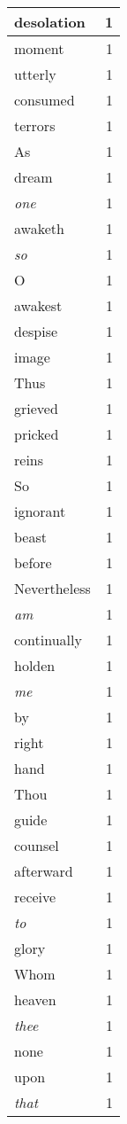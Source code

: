 \begin{center}
\begin{longtable}{l|r}
desolation & 1 \\ \hline
moment & 1 \\ \hline
utterly & 1 \\ \hline
consumed & 1 \\ \hline
terrors & 1 \\ \hline
As & 1 \\ \hline
dream & 1 \\ \hline
\emph{one} & 1 \\ \hline
awaketh & 1 \\ \hline
\emph{so} & 1 \\ \hline
O & 1 \\ \hline
awakest & 1 \\ \hline
despise & 1 \\ \hline
image & 1 \\ \hline
Thus & 1 \\ \hline
grieved & 1 \\ \hline
pricked & 1 \\ \hline
reins & 1 \\ \hline
So & 1 \\ \hline
ignorant & 1 \\ \hline
beast & 1 \\ \hline
before & 1 \\ \hline
Nevertheless & 1 \\ \hline
\emph{am} & 1 \\ \hline
continually & 1 \\ \hline
holden & 1 \\ \hline
\emph{me} & 1 \\ \hline
by & 1 \\ \hline
right & 1 \\ \hline
hand & 1 \\ \hline
Thou & 1 \\ \hline
guide & 1 \\ \hline
counsel & 1 \\ \hline
afterward & 1 \\ \hline
receive & 1 \\ \hline
\emph{to} & 1 \\ \hline
glory & 1 \\ \hline
Whom & 1 \\ \hline
heaven & 1 \\ \hline
\emph{thee} & 1 \\ \hline
none & 1 \\ \hline
upon & 1 \\ \hline
\emph{that} & 1 \\ \hline

\end{longtable}
\end{center}
